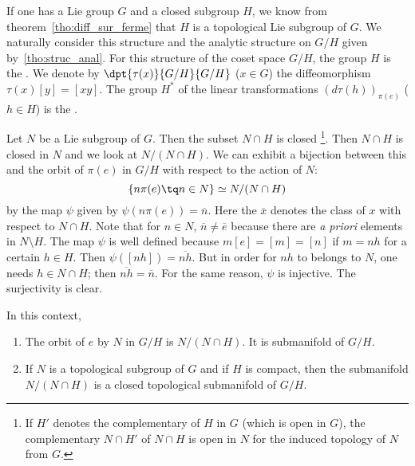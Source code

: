 If one has a Lie group $G$ and a closed subgroup $H$, we know from theorem~\ref{tho:diff_sur_ferme} that $H$ is a topological Lie subgroup of $G$. We naturally consider this structure and the analytic structure on $G/H$ given by~\ref{tho:struc_anal}. For this structure of the coset space $G/H$, the group $H$ is the . We denote by $\dpt{\tau(x)}{G/H}{G/H}$ ($x\in G$) the diffeomorphism $\tau(x)[y]=[xy]$. The group $H^*$ of the linear transformations $(d\tau(h))_{\pi(e)}$ ($h\in H$) is the .


Let $N$ be a Lie subgroup of $G$. Then the subset $N\cap H$ is closed
\footnote{If $H'$ denotes the complementary of $H$ in $G$ (which is open in $G$), the complementary $N\cap H'$ of $N\cap H$ is open in $N$ for the induced topology of $N$ from $G$.}. Then $N\cap H$ is closed in $N$ and we look at $N/(N\cap H)$. We can exhibit a bijection between this and the orbit of $\pi(e)$ in $G/H$ with respect to the action of $N$:
\begin{equation}
  \{ n\pi(e)\tq n\in N \}\simeq N/(N\cap H)
\end{equation}
by the map $\psi$ given by $\psi(n\pi(e))=\overline{n}$. Here the $\overline{ x }$ denotes the class of $x$ with respect to $N\cap H$. Note that for $n\in N$, $\overline{n}\neq\overline{e}$ because there are \emph{a priori} elements in $N\setminus H$. The map $\psi$ is well defined because $m[e]=[m]=[n]$ if $m=nh$ for a certain $h\in H$. Then $\psi([nh])=\overline{nh}$. But in order for $nh$ to belongs to $N$, one needs $h\in N\cap H$; then $\overline{nh}=\overline{n}$. For the same reason, $\psi$ is injective. The surjectivity is clear.

\begin{proposition}			\label{prop:orbit_N_ss_var}
	In this context,
	\begin{enumerate}
		\item The orbit of $e$ by $N$ in $G/H$ is $N/(N\cap H)$. It is submanifold of $G/H$.
		\item If $N$ is a topological subgroup of $G$ and if $H$ is compact, then the submanifold $N/(N\cap H)$ is a closed topological submanifold of $G/H$.
	\end{enumerate}
\end{proposition}

